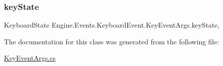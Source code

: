 \subsubsection{\texorpdfstring{key\+State}{keyState}}
{\footnotesize\ttfamily Keyboard\+State Engine.\+Events.\+Keyboard\+Event.\+Key\+Event\+Args.\+key\+State\hspace{0.3cm}{\ttfamily [get]}, {\ttfamily [set]}}



The documentation for this class was generated from the following file\+:\begin{DoxyCompactItemize}
\item 
\hyperlink{a00053}{Key\+Event\+Args.\+cs}\end{DoxyCompactItemize}
